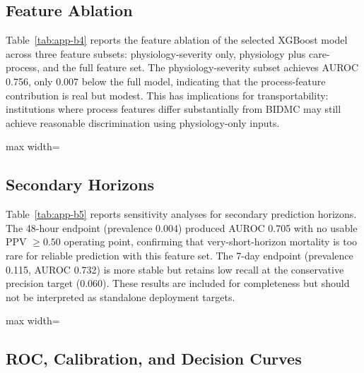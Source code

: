 \begin{appendices}
\subsection{Feature Ablation}

Table~\ref{tab:app-b4} reports the feature ablation of the selected XGBoost model across three feature subsets: physiology-severity only, physiology plus care-process, and the full feature set. The physiology-severity subset achieves AUROC 0.756, only 0.007 below the full model, indicating that the process-feature contribution is real but modest. This has implications for transportability: institutions where process features differ substantially from BIDMC may still achieve reasonable discrimination using physiology-only inputs.

\begin{table}[!t]
\centering
\scriptsize
\caption{Appendix Table B4. Feature ablation of the selected model.}
\label{tab:app-b4}
\begin{adjustbox}{max width=\textwidth}

\end{adjustbox}
\end{table}

\subsection{Secondary Horizons}

Table~\ref{tab:app-b5} reports sensitivity analyses for secondary prediction horizons. The 48-hour endpoint (prevalence 0.004) produced AUROC 0.705 with no usable PPV $\geq 0.50$ operating point, confirming that very-short-horizon mortality is too rare for reliable prediction with this feature set. The 7-day endpoint (prevalence 0.115, AUROC 0.732) is more stable but retains low recall at the conservative precision target (0.060). These results are included for completeness but should not be interpreted as standalone deployment targets.

\begin{table}[!t]
\centering
\scriptsize
\caption{Appendix Table B5. Secondary horizon sensitivity analyses.}
\label{tab:app-b5}
\begin{adjustbox}{max width=\textwidth}

\end{adjustbox}
\end{table}

\subsection{ROC, Calibration, and Decision Curves}


\end{appendices}
